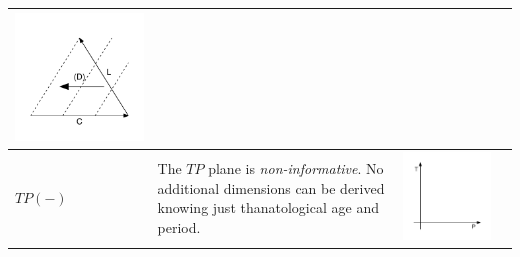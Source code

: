 \documentclass[11pt,oneside,a4paper]{article} %
\begin{document}
\begin{center}
\begin{longtable}{m{}m{}m{}m{}}
  \includegraphics[width = \linewidth]{Figures/JonasTable/LCd_iso.pdf}  \\
  \midrule
  $TP(-)$ &
  The $TP$ plane is \emph{non-informative}. No additional dimensions can be derived knowing just thanatological age and period. &
  \includegraphics[width = \linewidth]{Figures/JonasTable/TP.pdf} &

\end{longtable}
\end{center}
\end{document}
